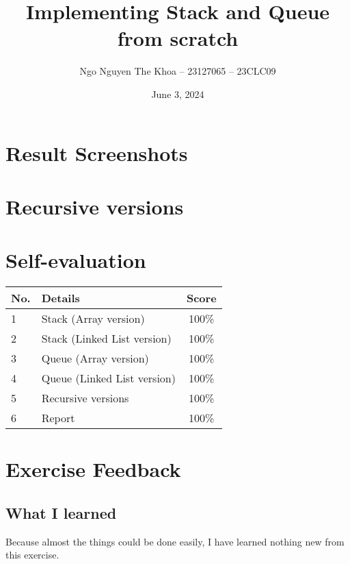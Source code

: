 \documentclass[a4paper,12pt]{report}
\title{Implementing Stack and Queue from scratch}
\author{Ngo Nguyen The Khoa -- 23127065 -- 23CLC09}
\date{June 3, 2024} %
\begin{document}

\tableofcontents\thispagestyle{empty}

\pagebreak
\section{Result Screenshots}



\pagebreak
\section{Recursive versions}



\pagebreak
\section{Self-evaluation}
\begin{center}
  \renewcommand{\arraystretch}{1.5}
  \begin{tabular}{|l|p{}|c|}
    \hline
    \textbf{No.} & \textbf{Details}            & \textbf{Score} \\ \hline
    1            & Stack (Array version)       & 100\%          \\ \hline
    2            & Stack (Linked List version) & 100\%          \\ \hline
    3            & Queue (Array version)       & 100\%          \\ \hline
    4            & Queue (Linked List version) & 100\%          \\ \hline
    5            & Recursive versions          & 100\%          \\ \hline
    6            & Report                      & 100\%          \\ \hline
  \end{tabular}
\end{center}

\section{Exercise Feedback}
\subsection{What I learned}
\begin{flushleft}
  Because almost the things could be done easily, I have learned nothing new from this exercise.
\end{flushleft}
\end{document}
